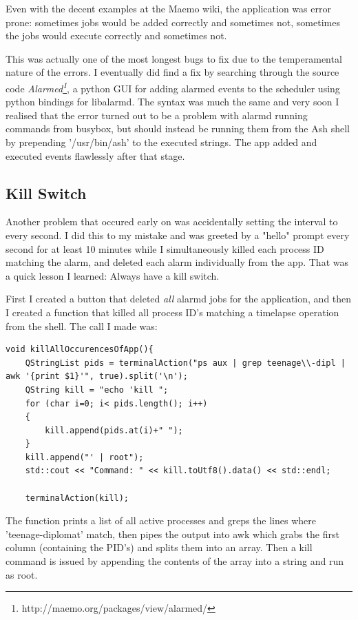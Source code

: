 Even with the decent examples at the Maemo wiki, the application was error prone: sometimes jobs would be added correctly and sometimes not, sometimes the jobs would execute correctly and sometimes not. 

This was actually one of the most longest bugs to fix due to the temperamental nature of the errors. I eventually did find a fix by searching through the source code {\it Alarmed\footnote{http://maemo.org/packages/view/alarmed/}}, a python GUI for adding alarmed events to the scheduler using python bindings for libalarmd. The syntax was much the same and very soon I realised that the error turned out to be a problem with alarmd running commands from busybox, but should instead be running them from the Ash shell by prepending '/usr/bin/ash' to the executed strings. The app added and executed events flawlessly after that stage.

\subsection{Kill Switch}


Another problem that occured early on was accidentally setting the interval to every second. I did this to my mistake and was greeted by a "hello" prompt every second for at least 10 minutes while I simultaneously killed each process ID matching the alarm, and deleted each alarm individually from the app. That was a quick lesson I learned: Always have a kill switch.

First I created a button that deleted {\it all} alarmd jobs for the application, and then I created a function that killed all process ID's matching a timelapse operation from the shell. The call I made was:\\
\vspace{-20pt}
\begin{lstlisting}[title=Kill Function]
void killAllOccurencesOfApp(){
    QStringList pids = terminalAction("ps aux | grep teenage\\-dipl | awk '{print $1}'", true).split('\n');
    QString kill = "echo 'kill ";
    for (char i=0; i< pids.length(); i++)
    {
        kill.append(pids.at(i)+" ");
    }
    kill.append("' | root");
    std::cout << "Command: " << kill.toUtf8().data() << std::endl;

    terminalAction(kill);
\end{lstlisting}
The function prints a list of all active processes and greps the lines where 'teenage-diplomat' match, then pipes the output into awk which grabs the first column (containing the PID's) and splits them into an array. Then a kill command is issued by appending the contents of the array into a string and run as root.

